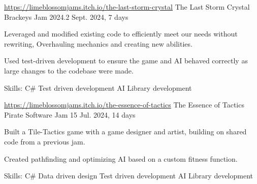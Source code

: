 

\begin{cventries}

 \cventry
  {\href{https://limeblossomjams.itch.io/the-last-storm-crystal}{https://limeblossomjams.itch.io/the-last-storm-crystal}} %
   {The Last Storm Crystal} %
   {Brackeys Jam 2024.2} %
   {Sept. 2024, 7 days} %
   {
     \begin{cvitems} %
      \item {Leveraged and modified existing code to efficiently meet our needs without rewriting, Overhauling mechanics and creating new abilities.}
      \item {Used test-driven development to ensure the game and AI behaved correctly as large changes to the codebase were made.}
      \item {Skills: C\# \textbullet{} Test driven development \textbullet{} AI \textbullet{} Library development }
     \end{cvitems}
   }
 
  \cventry
   {\href{https://limeblossomjams.itch.io/the-essence-of-tactics}{https://limeblossomjams.itch.io/the-essence-of-tactics}} %
    {The Essence of Tactics} %
    {Pirate Software Jam 15} %
    {Jul. 2024, 14 days} %
    {
      \begin{cvitems} %
        \item {Built a Tile-Tactics game with a game designer and artist, building on shared code from a previous jam.}
        \item {Created pathfinding and optimizing AI based on a custom fitness function.}
        \item {Skills: C\# \textbullet{} Data driven design \textbullet{} Test driven development \textbullet{} AI \textbullet{} Library development }
      \end{cvitems}
    }


\end{cventries}

